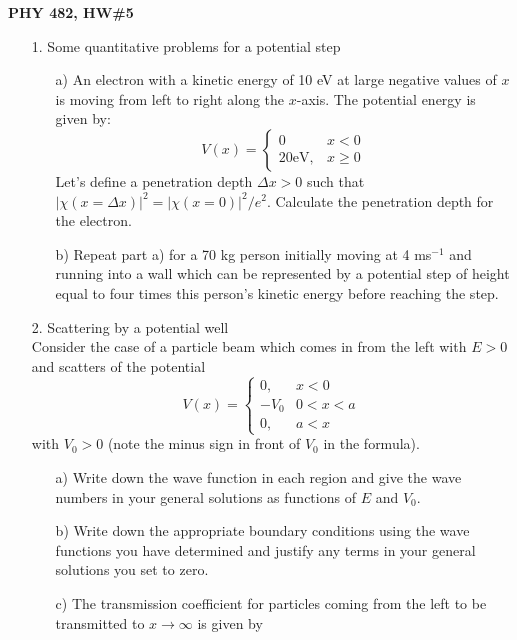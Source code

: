 \documentclass[11pt]{article}
\begin{document}
\thispagestyle{empty}

\centerline{\bf PHY 482, HW\#5}

\begin{itemize}
%
\item[1.] Some quantitative problems for a potential step
\begin{itemize}
%
\item[a)]
An electron with a kinetic energy of 10 eV at large negative values of $x$ is moving from left to right
along the $x$-axis. The potential energy is given by:
\begin{displaymath}
V(x) =
\begin{cases}
0 &x<0\\
20 \mbox{eV}, &x \ge 0
\end{cases}
\end{displaymath}
Let's define a penetration depth $\Delta x > 0$ such that $|\chi(x=\Delta x)|^2 = |\chi(x=0)|^2/e^2$. Calculate the penetration depth for the electron.
\item[b)]
Repeat part a) for a 70 kg person initially moving at 4 ms$^{-1}$ and running into a wall which can be represented
by a potential step of height equal to four times this person's kinetic energy before reaching the step.
\end{itemize}
%
\vspace*{0.5cm}
%
\item[2.] Scattering by a potential well\\
Consider the case of a particle beam which comes in from the left with $E>0$ and scatters of the potential
\begin{displaymath}
V(x) =
\begin{cases}
0, &x < 0\\
-V_0&0 < x < a\\
0, &a < x
\end{cases}
\end{displaymath}
with $V_0>0$ (note the minus sign in front of $V_0$ in the formula).
\begin{itemize}
\item[a)]
Write down the wave function in each region and give the wave numbers in your general solutions as functions of $E$ and $V_0$.
\item[b)]
Write down the appropriate boundary conditions using the wave functions you have determined and justify any terms in your general solutions you set to zero.
\item[c)]
The transmission coefficient for particles coming from the left to be transmitted to $x \rightarrow \infty$ is given by

\end{itemize}
\end{itemize}
\end{document}
